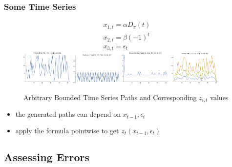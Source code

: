 \documentclass[notheorems]{beamer}
\begin{document}
\begin{frame}
  \frametitle{Some Time Series}


\begin{figure}
  \centering
\begin{gather}
  x_{1,t}=\alpha D_\pi(t) \\
x_{2,t}=\beta (-1)^t\\
x_{3,t}=\epsilon_t 
\end{gather} 
\includegraphics[width=1in]{piPath.pdf}
\includegraphics[width=1in]{oscillPath.pdf}
\includegraphics[width=1in]{pseudoPath.pdf}
\includegraphics[width=1in]{theZs.pdf}  
  
  \caption{Arbitrary Bounded Time Series Paths and Corresponding $z_{i,t}$ values}\label{arbpaths}
\end{figure}

\begin{itemize}
\item the generated paths can depend on $x_{t-1},\epsilon_t$
  
\item apply the formula pointwise to get $z_t(x_{t-1},\epsilon_t)$
\end{itemize}

\end{frame}

\subsection{Assessing Errors}
\label{sec:assessing-errors}
\end{document}
